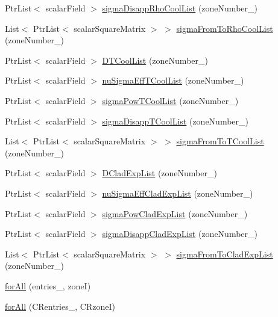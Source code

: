 \begin{DoxyCompactItemize}
Ptr\+List$<$ scalar\+Field $>$ \hyperlink{readNuclearData_8H_a09ecb37caeb3824fcc43759fba4ada33}{sigma\+Disapp\+Rho\+Cool\+List} (zone\+Number\+\_\+)
\item 
List$<$ Ptr\+List$<$ scalar\+Square\+Matrix $>$ $>$ \hyperlink{readNuclearData_8H_af0208ac90cc1c2153e8a9206cdb79457}{sigma\+From\+To\+Rho\+Cool\+List} (zone\+Number\+\_\+)
\item 
Ptr\+List$<$ scalar\+Field $>$ \hyperlink{readNuclearData_8H_afb5b5d357f9a51bcd4e5f519814f7c7d}{D\+T\+Cool\+List} (zone\+Number\+\_\+)
\item 
Ptr\+List$<$ scalar\+Field $>$ \hyperlink{readNuclearData_8H_a56bd2aa6903ca24b2996478e3069acb4}{nu\+Sigma\+Eff\+T\+Cool\+List} (zone\+Number\+\_\+)
\item 
Ptr\+List$<$ scalar\+Field $>$ \hyperlink{readNuclearData_8H_a9b4bf9eec4053cfd73f50b3166ee4238}{sigma\+Pow\+T\+Cool\+List} (zone\+Number\+\_\+)
\item 
Ptr\+List$<$ scalar\+Field $>$ \hyperlink{readNuclearData_8H_a2c85d8518fcb8e2373c337b4a0b9f12b}{sigma\+Disapp\+T\+Cool\+List} (zone\+Number\+\_\+)
\item 
List$<$ Ptr\+List$<$ scalar\+Square\+Matrix $>$ $>$ \hyperlink{readNuclearData_8H_aec00aee42aa4bcc866c55a2bf28e718f}{sigma\+From\+To\+T\+Cool\+List} (zone\+Number\+\_\+)
\item 
Ptr\+List$<$ scalar\+Field $>$ \hyperlink{readNuclearData_8H_a0b20f5d5d3a7d538732a088700162f17}{D\+Clad\+Exp\+List} (zone\+Number\+\_\+)
\item 
Ptr\+List$<$ scalar\+Field $>$ \hyperlink{readNuclearData_8H_a5fcf82349fabf302f7082bfe6b409805}{nu\+Sigma\+Eff\+Clad\+Exp\+List} (zone\+Number\+\_\+)
\item 
Ptr\+List$<$ scalar\+Field $>$ \hyperlink{readNuclearData_8H_a7a20b2877f90d44db7ef821a29b92227}{sigma\+Pow\+Clad\+Exp\+List} (zone\+Number\+\_\+)
\item 
Ptr\+List$<$ scalar\+Field $>$ \hyperlink{readNuclearData_8H_a6535e9cb52020c71b8a387a09bbbd308}{sigma\+Disapp\+Clad\+Exp\+List} (zone\+Number\+\_\+)
\item 
List$<$ Ptr\+List$<$ scalar\+Square\+Matrix $>$ $>$ \hyperlink{readNuclearData_8H_a127596d2781e3b87e8eb3468b5e38c0d}{sigma\+From\+To\+Clad\+Exp\+List} (zone\+Number\+\_\+)
\item 
\hyperlink{readNuclearData_8H_a1ba0a86d00d625275de858f1a01edb9f}{for\+All} (entries\+\_\+, zoneI)
\item 
\hyperlink{readNuclearData_8H_a2428955ee674d42574e73d905589463a}{for\+All} (C\+Rentries\+\_\+, C\+RzoneI)
\end{DoxyCompactItemize}


